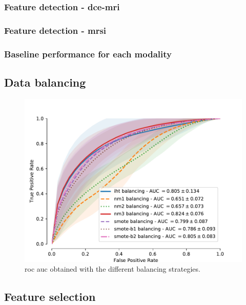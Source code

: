 \documentclass[a4paper,num-refs]{wiley-article}
\begin{document}
\subsubsection{Feature detection - \Ac{dce}-\ac{mri}}\label{exp:dce_sel}

\subsubsection{Feature detection - \Ac{mrsi}}\label{exp:mrsi}

\subsubsection{Baseline performance for each modality}

\subsection{Data balancing}\label{exp:balancing}

\begin{figure}
  \centering
  \includegraphics[width=0.5\linewidth]{images/aggregation.pdf}
  \caption[Balancing]{\ac{roc} \ac{auc} obtained with the different balancing strategies.}
  \label{fig:balancing}
\end{figure}

\subsection{Feature selection}\label{exp:selection}
\end{document}
